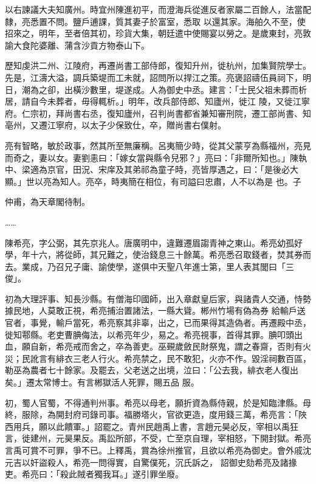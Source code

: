 \begin{pinyinscope}
 以右諫議大夫知廣州。時宜州陳進初平，而澄海兵從進反者家屬二百餘人，法當配隸，亮悉置不問。鹽戶逋課，質其妻子於富室，悉取
 以還其家。海舶久不至，使招來之，明年，至者倍其初，珍貨大集，朝廷遣中使賜宴以勞之。是歲東封，亮敦諭大食陀婆離、蒲含沙貢方物泰山下。



 歷知虔洪二州、江陵府，再遷尚書工部侍郎，復知升州，徙杭州，加集賢院學士。先是，江濤大溢，調兵築堤而工未就，詔問所以捍江之策。亮褒詔禱伍員祠下，明日，潮為之卻，出橫沙數里，堤遂成。人為御史中丞。建言：「士民父祖未葬而析居，請自今未葬者，毋得輒析。」明年，改兵部侍郎、知廬州，徙江
 陵，又徙江寧府。仁宗初，拜尚書右丞，復知廬州，召判尚書都省兼知審刑院，遷工部尚書、知亳州，又遷江寧府，以太子少保致仕，卒，贈尚書右僕射。



 亮有智略，敏於政事，然其所至無廉稱。呂夷簡少時，從其父蒙亨為縣福州，亮見而奇之，妻以女。妻劉恚曰：「嫁女當與縣令兒邪？」亮曰：「非爾所知也。」陳執中、梁適為京官，田況、宋庠及其弟祁為童子時，亮皆厚遇之，曰：「是後必大顯。」世以亮為知人。亮卒，時夷簡在相位，有司謚曰忠肅，人不以為是
 也。子



 仲甫，為天章閣待制。



 ……



 陳希亮，字公弼，其先京兆人。唐廣明中，違難遷眉謅青神之東山。希亮幼孤好學，年十六，將從師，其兄難之，使治錢息三十餘萬。希亮悉召取錢者，焚其券而去。業成，乃召兄子庸、諭使學，遂俱中天聖八年進士第，里人表其閭曰「三俊」。



 初為大理評事、知長沙縣。有僧海印國師，出入章獻皇后家，與諸貴人交通，恃勢據民地，人莫敢正視，希亮捕治置諸法，一縣大聳。郴州竹場有偽為券
 給輸戶送官者，事覺，輸戶當死，希亮察其非辜，出之，已而果得其造偽者。再遷殿中丞，徙知鄠縣。老吏曹腆侮法，以希亮年少，易之。希亮視事，首得其罪。腆叩頭出血，願自新，希亮戒而舍之，卒為善吏。巫覡歲斂民財祭鬼，謂之春齋，否則有火災；民訛言有緋衣三老人行火。希亮禁之，民不敢犯，火亦不作。毀淫祠數百區，勒巫為農者七十餘家。及罷去，父老送之出境，泣曰：「公去我，緋衣老人復出矣。」遷太常博士。有言郴獄活人死罪，賜五品
 服。



 初，蜀人官蜀，不得通判州事。希亮以母老，願折資為縣侍親，於是知臨津縣。母終，服除，為開封府司錄司事。福勝塔火，官欲更造，度用錢三萬，希亮言：「陜西用兵，願以此饋軍。」詔罷之。青州民趙禹上書，言趙元昊必反，宰相以禹狂言，徙建州，元昊果反。禹訟所部，不受，亡至京自理，宰相怒，下開封獄。希亮言禹可賞不可罪，爭不已。上釋禹，賞為徐州推官，且欲以希亮為御史。會外戚沈元吉以奸盜殺人，希亮一問得實，自驚僕死，沉氏訴之，
 詔御史劾希亮及諸掾吏。希亮曰：「殺此賊者獨我耳。」遂引罪坐廢。




\end{pinyinscope}
